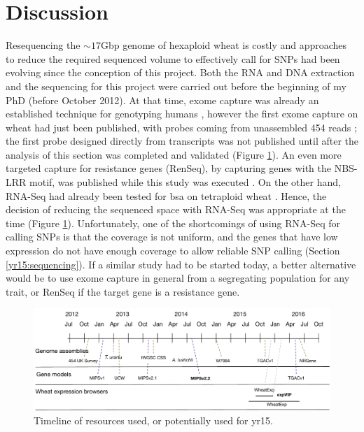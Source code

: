 \section{Discussion} 


Resequencing the $\sim17$Gbp genome of hexaploid wheat is costly and approaches to reduce the required sequenced volume to effectively call for SNPs had been evolving since the conception of this project. 
Both the RNA and DNA extraction and the sequencing for this project were carried out before the beginning of my PhD (before October 2012). 
At that time, exome capture was already an established technique for genotyping humans \citep{Ng2009}, however the first exome capture on wheat had just been published, with probes coming from unassembled 454 reads \citep{Winfield2012}; the first probe designed directly from transcripts \citep{Henry2014} was not published until after the analysis of this section was completed and validated (Figure \ref{fig:yr15:timeline}).
An even more targeted capture for resistance genes (RenSeq), by capturing genes with the NBS-LRR motif, was published while this study was executed \citep{Jupe2013}.
On the other hand, RNA-Seq had already been tested for \acrlong{bsa} on tetraploid wheat \citep{Trick2012}.  
Hence, the decision of reducing the sequenced space with RNA-Seq was appropriate at the time (Figure \ref{fig:yr15:timeline}). 
Unfortunately, one of the shortcomings of using RNA-Seq for calling SNPs is that the coverage is not uniform, and the genes that have low expression do not have enough coverage to allow reliable SNP calling (Section  \ref{yr15:sequencing}).
If a similar study had to be started today, a better alternative would be to use exome capture in general from a segregating population for any trait, or RenSeq if the target gene is a resistance gene. 

\begin{figure}
\includegraphics[width=1\textwidth]{expVIP/Figures/Timeline.pdf}
\caption{Timeline of resources used, or potentially used for \gls{yr15}.}
\label{fig:yr15:timeline}
\end{figure}


